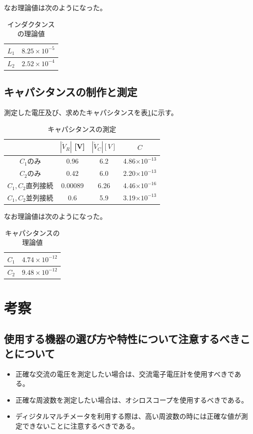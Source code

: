 \documentclass[dvipdfmx]{jsarticle}
\begin{document}
なお理論値は次のようになった。
\begin{table}[h]
  \centering
  \caption{インダクタンスの理論値}
  \begin{tabular}{|c|c|}\hline
    $L_1$ & $8.25\times10^{-5}$\\ \hline
    $L_2$ & $2.52\times10^{-4}$\\ \hline
  \end{tabular}
\end{table}

\subsection{キャパシタンスの制作と測定}
測定した電圧及び、求めたキャパシタンスを表\ref{tb:result10}に示す。
\begin{table}[h]
  \centering
  \caption{キャパシタンスの測定}
  \label{tb:result10}
  \begin{tabular}{|c|c|c|c|}\hline
    & $|\dot V_R|$ [V] & $|\dot V_C| [V]$ & $C$\\ \hline
    $C_1$のみ & 0.96 & 6.2 & 4.86$\times 10^{-13}$\\ \hline
    $C_2$のみ & 0.42 & 6.0 & 2.20$\times 10^{-13}$\\ \hline
    $C_1, C_2$直列接続 & 0.00089 & 6.26 & 4.46$\times 10^{-16}$\\ \hline
    $C_1, C_2$並列接続 & 0.6 & 5.9 & 3.19$\times 10^{-13}$\\ \hline
  \end{tabular}
\end{table}

なお理論値は次のようになった。
\begin{table}[h]
  \centering
  \caption{キャパシタンスの理論値}
  \begin{tabular}{|c|c|}\hline
    $C_1$ & $4.74\times10^{-12}$\\ \hline
    $C_2$ & $9.48\times10^{-12}$\\ \hline
  \end{tabular}
\end{table}

\section{考察}
\subsection{使用する機器の選び方や特性について注意するべきことについて}
\begin{itemize}
  \item 正確な交流の電圧を測定したい場合は、交流電子電圧計を使用すべきである。
  \item 正確な周波数を測定したい場合は、オシロスコープを使用するべきである。
  \item ディジタルマルチメータを利用する際は、高い周波数の時には正確な値が測定できないことに注意するべきである。
\end{itemize}
\end{document}
